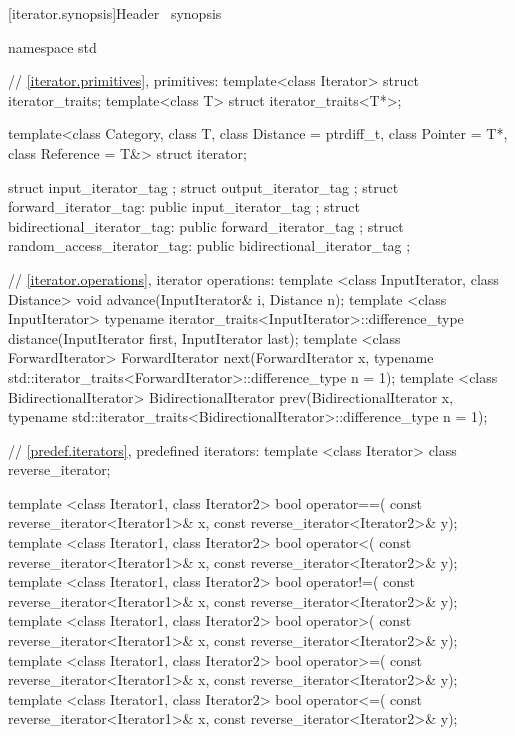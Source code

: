 [iterator.synopsis]{Header \ synopsis}

%
\begin{codeblock}
namespace std {
  // \ref{iterator.primitives}, primitives:
  template<class Iterator> struct iterator_traits;
  template<class T> struct iterator_traits<T*>;

  template<class Category, class T, class Distance = ptrdiff_t,
       class Pointer = T*, class Reference = T&> struct iterator;

  struct input_iterator_tag { };
  struct output_iterator_tag { };
  struct forward_iterator_tag: public input_iterator_tag { };
  struct bidirectional_iterator_tag: public forward_iterator_tag { };
  struct random_access_iterator_tag: public bidirectional_iterator_tag { };

  // \ref{iterator.operations}, iterator operations:
  template <class InputIterator, class Distance>
    void advance(InputIterator& i, Distance n);
  template <class InputIterator>
    typename iterator_traits<InputIterator>::difference_type
    distance(InputIterator first, InputIterator last);
  template <class ForwardIterator>
    ForwardIterator next(ForwardIterator x,
      typename std::iterator_traits<ForwardIterator>::difference_type n = 1);
  template <class BidirectionalIterator>
    BidirectionalIterator prev(BidirectionalIterator x,
      typename std::iterator_traits<BidirectionalIterator>::difference_type n = 1);

  // \ref{predef.iterators}, predefined iterators:
  template <class Iterator> class reverse_iterator;

  template <class Iterator1, class Iterator2>
    bool operator==(
      const reverse_iterator<Iterator1>& x,
      const reverse_iterator<Iterator2>& y);
  template <class Iterator1, class Iterator2>
    bool operator<(
      const reverse_iterator<Iterator1>& x,
      const reverse_iterator<Iterator2>& y);
  template <class Iterator1, class Iterator2>
    bool operator!=(
      const reverse_iterator<Iterator1>& x,
      const reverse_iterator<Iterator2>& y);
  template <class Iterator1, class Iterator2>
    bool operator>(
      const reverse_iterator<Iterator1>& x,
      const reverse_iterator<Iterator2>& y);
  template <class Iterator1, class Iterator2>
    bool operator>=(
      const reverse_iterator<Iterator1>& x,
      const reverse_iterator<Iterator2>& y);
  template <class Iterator1, class Iterator2>
    bool operator<=(
      const reverse_iterator<Iterator1>& x,
      const reverse_iterator<Iterator2>& y);

}
\end{codeblock}
